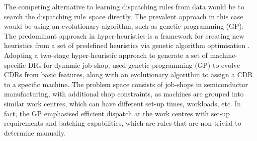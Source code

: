 \documentclass[twocolumn]{svjour3}
\newcommand{\dr}{dispatching rule}
\newcommand{\sdr}{single priority \dr}
\begin{document}
The competing alternative to learning dispatching rules from data would be to 
search the \dr\ space directly. The prevalent approach in this case would be 
using an evolutionary algorithm, such as genetic programming (GP). 
%
The predominant approach in hyper-heuristics is a framework for creating 
new heuristics from a set of predefined heuristics via genetic algorithm 
optimisation \cite{Burke10}. 
Adopting a two-stage hyper-heuristic approach to generate a set of 
machine-specific DRs for dynamic job-shop, \cite{Pickardt2013} used genetic 
programming (GP) to evolve CDRs from basic features, along with an evolutionary 
algorithm to assign a CDR to a specific machine. 
The problem space consists of job-shops in semiconductor manufacturing, with 
additional shop constraints, as machines are grouped into similar work centres, 
which can have different set-up times, workloads, etc. 
In fact, the GP emphasised efficient dispatch at the work centres with 
set-up requirements and batching capabilities, which are rules that are 
non-trivial to determine manually.
\end{document}
